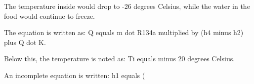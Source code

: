The temperature inside would drop to -26 degrees Celsius, while the water in the food would continue to freeze.

The equation is written as:  
Q equals m dot R134a multiplied by (h4 minus h2) plus Q dot K.  

Below this, the temperature is noted as:  
Ti equals minus 20 degrees Celsius.  

An incomplete equation is written:  
h1 equals (